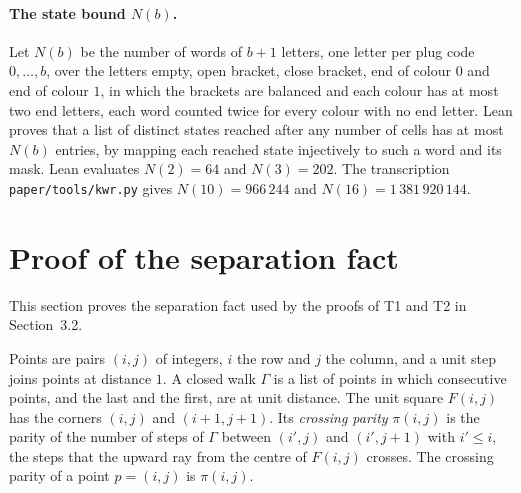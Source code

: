 \documentclass[11pt]{article}
\newcommand{\lean}[1]{\texttt{#1}}
\begin{document}
\paragraph{The state bound $N(b)$.} Let $N(b)$ be the number of words of $b+1$ letters, one letter
per plug code $0,\ldots,b$, over the letters empty, open bracket, close bracket, end of colour $0$
and end of colour $1$, in which the brackets are balanced and each colour has at most two end
letters, each word counted twice for every colour with no end letter. Lean proves that a list of
distinct states reached after any number of cells has at most $N(b)$ entries, by mapping each
reached state injectively to such a word and its mask. Lean evaluates $N(2)=64$ and $N(3)=202$.
The transcription \lean{paper/tools/kwr.py} gives $N(10)=966\,244$ and
$N(16)=1\,381\,920\,144$.

\section{Proof of the separation fact}\label{sec:sep}

This section proves the separation fact used by the proofs of T1 and T2 in Section~3.2.

Points are pairs $(i,j)$ of integers, $i$ the row and $j$ the column, and a unit step joins points
at distance $1$. A closed walk $\Gamma$ is a list of points in which consecutive points, and the
last and the first, are at unit distance. The unit square $F(i,j)$ has the corners $(i,j)$ and
$(i+1,j+1)$. Its \emph{crossing parity} $\pi(i,j)$ is the parity of the number of steps of $\Gamma$
between $(i',j)$ and $(i',j+1)$ with $i'\le i$, the steps that the upward ray from the centre of
$F(i,j)$ crosses. The crossing parity of a point $p=(i,j)$ is $\pi(i,j)$.
\end{document}
